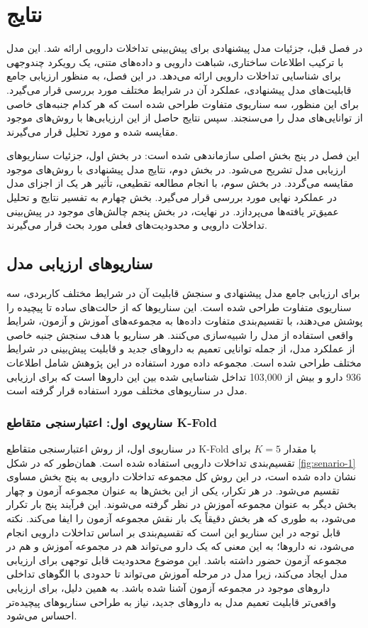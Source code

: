 \chapter{نتایج}

در فصل قبل، جزئیات مدل پیشنهادی برای پیش‌بینی تداخلات دارویی ارائه شد. این مدل با ترکیب اطلاعات ساختاری، شباهت دارویی و داده‌های متنی، یک رویکرد چندوجهی برای شناسایی تداخلات دارویی ارائه می‌دهد. در این فصل، به منظور ارزیابی جامع قابلیت‌های مدل پیشنهادی، عملکرد آن در شرایط مختلف مورد بررسی قرار می‌گیرد. برای این منظور، سه سناریوی متفاوت طراحی شده است که هر کدام جنبه‌های خاصی از توانایی‌های مدل را می‌سنجند. سپس نتایج حاصل از این ارزیابی‌ها با روش‌های موجود مقایسه شده و مورد تحلیل قرار می‌گیرند.

این فصل در پنج بخش اصلی سازماندهی شده است: در بخش اول، جزئیات سناریوهای ارزیابی مدل تشریح می‌شود. در بخش دوم، نتایج مدل پیشنهادی با روش‌های موجود مقایسه می‌گردد. در بخش سوم، با انجام مطالعه تقطیعی، تأثیر هر یک از اجزای مدل در عملکرد نهایی مورد بررسی قرار می‌گیرد. بخش چهارم به تفسیر نتایج و تحلیل عمیق‌تر یافته‌ها می‌پردازد. در نهایت، در بخش پنجم چالش‌های موجود در پیش‌بینی تداخلات دارویی و محدودیت‌های فعلی مورد بحث قرار می‌گیرند.

\section{سناریوهای ارزیابی مدل}

برای ارزیابی جامع مدل پیشنهادی و سنجش قابلیت آن در شرایط مختلف کاربردی، سه سناریوی متفاوت طراحی شده است. این سناریوها که از حالت‌های ساده تا پیچیده را پوشش می‌دهند، با تقسیم‌بندی متفاوت داده‌ها به مجموعه‌های آموزش و آزمون، شرایط واقعی استفاده از مدل را شبیه‌سازی می‌کنند. هر سناریو با هدف سنجش جنبه خاصی از عملکرد مدل، از جمله توانایی تعمیم به داروهای جدید و قابلیت پیش‌بینی در شرایط مختلف طراحی شده است. مجموعه داده مورد استفاده در این پژوهش شامل اطلاعات 936 دارو و بیش از 103,000 تداخل شناسایی شده بین این داروها است که برای ارزیابی مدل در سناریوهای مختلف مورد استفاده قرار گرفته است.


\subsection{سناریوی اول: اعتبارسنجی متقاطع K-Fold}

در سناریوی اول، از روش اعتبارسنجی متقاطع K-Fold با مقدار $K=5$ برای تقسیم‌بندی تداخلات دارویی استفاده شده است. همان‌طور که در شکل \ref{fig:senario-1} نشان داده شده است، در این روش کل مجموعه تداخلات دارویی به پنج بخش مساوی تقسیم می‌شود. در هر تکرار، یکی از این بخش‌ها به عنوان مجموعه آزمون و چهار بخش دیگر به عنوان مجموعه آموزش در نظر گرفته می‌شوند. این فرآیند پنج بار تکرار می‌شود، به طوری که هر بخش دقیقاً یک بار نقش مجموعه آزمون را ایفا می‌کند. نکته قابل توجه در این سناریو این است که تقسیم‌بندی بر اساس تداخلات دارویی انجام می‌شود، نه داروها؛ به این معنی که یک دارو می‌تواند هم در مجموعه آموزش و هم در مجموعه آزمون حضور داشته باشد. این موضوع محدودیت قابل توجهی برای ارزیابی مدل ایجاد می‌کند، زیرا مدل در مرحله آموزش می‌تواند تا حدودی با الگوهای تداخلی داروهای موجود در مجموعه آزمون آشنا شده باشد. به همین دلیل، برای ارزیابی واقعی‌تر قابلیت تعمیم مدل به داروهای جدید، نیاز به طراحی سناریوهای پیچیده‌تر احساس می‌شود.

